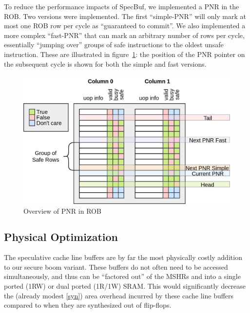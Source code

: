 To reduce the performance impacts of SpecBuf, we implemented a PNR in the ROB. Two versions were implemented. The first ``simple-PNR'' will only mark at most one ROB row per cycle as ``guaranteed to commit''. We also implemented a more complex ``fast-PNR'' that can mark an arbitrary number of rows per cycle, essentially ``jumping over'' groups of safe instructions to the oldest unsafe instruction. These are illustrated in figure~\ref{PNR}: the position of the PNR pointer on the subsequent cycle is shown for both the simple and fast versions.

\begin{figure}[h]
  \begin{center}\includegraphics[scale=0.17]{rob_pnr.png}\end{center}
  \caption{Overview of PNR in ROB}
  \label{PNR}
\end{figure}

\subsection{Physical Optimization}
The speculative cache line buffers are by far the most physically costly addition to our secure boom variant. These buffers do not often need to be accessed simultaneously, and thus can be ``factored out'' of the MSHRs and into a single ported (1RW) or dual ported (1R/1W) SRAM. This would significantly decrease the (already modest \ref{syn}) area overhead incurred by these cache line buffers compared to when they are synthesized out of flip-flops.

